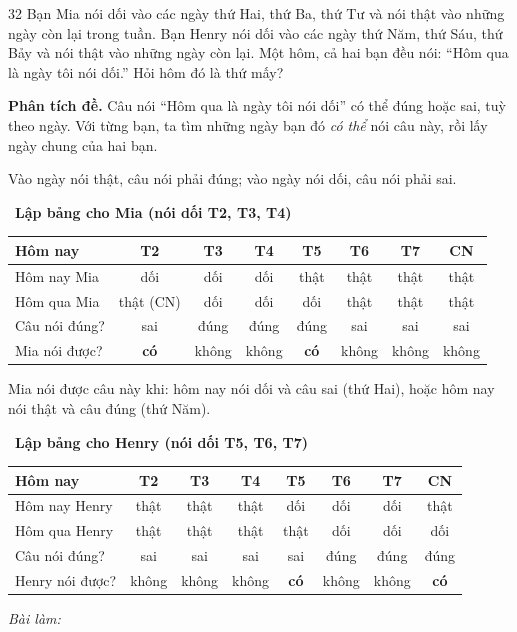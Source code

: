 \documentclass[11pt]{article}
\newif\ifsol \solfalse
\newenvironment{probbox}[2]{\begin{probboxT}{#1}{#2}}{\end{probboxT}}
\newcommand{\StuProb}[2]{\begin{probboxS}{#1}{#2}\StuProbBody\end{probboxS}}
\newcommand{\probsol}[1]{%
  \begin{lrbox}{\solmeasure}\begin{minipage}{\dimexpr\linewidth-24pt\relax}#1\end{minipage}\end{lrbox}%
  \ifsol
    \begin{solbox}#1\end{solbox}%
  \else
    \setlength{\solht}{\dimexpr\ht\solmeasure+\dp\solmeasure+0.85cm\relax}%
    \ifdim\solht<1.35cm\setlength{\solht}{1.35cm}\fi
    \ifdim\solht>\StudentMaxWork\setlength{\solht}{\StudentMaxWork}\fi
    \par\noindent\begin{minipage}{\linewidth}%
    \expandafter\StuProb\StuProbArgs
    \begin{tcolorbox}[colback=white,colframe=Line,boxrule=0.8pt,arc=5pt,
      left=8pt,right=8pt,top=4pt,bottom=4pt,height=\solht]{\footnotesize\color{Slate}\itshape\WorkWord}\end{tcolorbox}%
    \end{minipage}\par\medskip
  \fi}
\newlength{\StudentMaxWork}\setlength{\StudentMaxWork}{4.5cm}
\newcommand{\step}[2]{\par\smallskip\noindent{\bfseries\color{tmBlue!85!black}\StepWord~#1.}\ {\bfseries #2}\par\nopagebreak}
\def\WorkWord{Bài làm:}
\def\StepWord{Bước}
\begin{document}

\begin{probbox}{32}{\relax}
Bạn Mia nói dối vào các ngày thứ Hai, thứ Ba, thứ Tư và nói thật vào những ngày còn lại trong tuần. Bạn Henry nói dối vào các ngày
thứ Năm, thứ Sáu, thứ Bảy và nói thật vào những ngày còn lại. Một hôm, cả hai bạn đều nói: ``Hôm qua là ngày tôi nói dối.''
Hỏi hôm đó là thứ mấy?
\end{probbox}
\probsol{
\textbf{Phân tích đề.} Câu nói ``Hôm qua là ngày tôi nói dối'' có thể đúng hoặc sai, tuỳ theo ngày. Với từng bạn, ta tìm những ngày
bạn đó \emph{có thể} nói câu này, rồi lấy ngày chung của hai bạn.
\begin{recallbox}Vào ngày nói thật, câu nói phải đúng; vào ngày nói dối, câu nói phải sai.\end{recallbox}
\step{1}{Lập bảng cho Mia (nói dối T2, T3, T4)}
\begin{center}\small
\begin{tabular}{|l|c|c|c|c|c|c|c|}
\hline
\rowcolor{tmBlue!10} Hôm nay & T2 & T3 & T4 & T5 & T6 & T7 & CN\\ \hline
Hôm nay Mia & dối & dối & dối & thật & thật & thật & thật\\ \hline
Hôm qua Mia & thật (CN) & dối & dối & dối & thật & thật & thật\\ \hline
Câu nói đúng? & sai & đúng & đúng & đúng & sai & sai & sai\\ \hline
Mia nói được? & \textbf{có} & không & không & \textbf{có} & không & không & không\\ \hline
\end{tabular}
\end{center}
Mia nói được câu này khi: hôm nay nói dối và câu sai (thứ Hai), hoặc hôm nay nói thật và câu đúng (thứ Năm).
\step{2}{Lập bảng cho Henry (nói dối T5, T6, T7)}
\begin{center}\small
\begin{tabular}{|l|c|c|c|c|c|c|c|}
\hline
\rowcolor{tmBlue!10} Hôm nay & T2 & T3 & T4 & T5 & T6 & T7 & CN\\ \hline
Hôm nay Henry & thật & thật & thật & dối & dối & dối & thật\\ \hline
Hôm qua Henry & thật & thật & thật & thật & dối & dối & dối\\ \hline
Câu nói đúng? & sai & sai & sai & sai & đúng & đúng & đúng\\ \hline
Henry nói được? & không & không & không & \textbf{có} & không & không & \textbf{có}\\ \hline

\end{tabular}
\end{center}}
\end{document}
